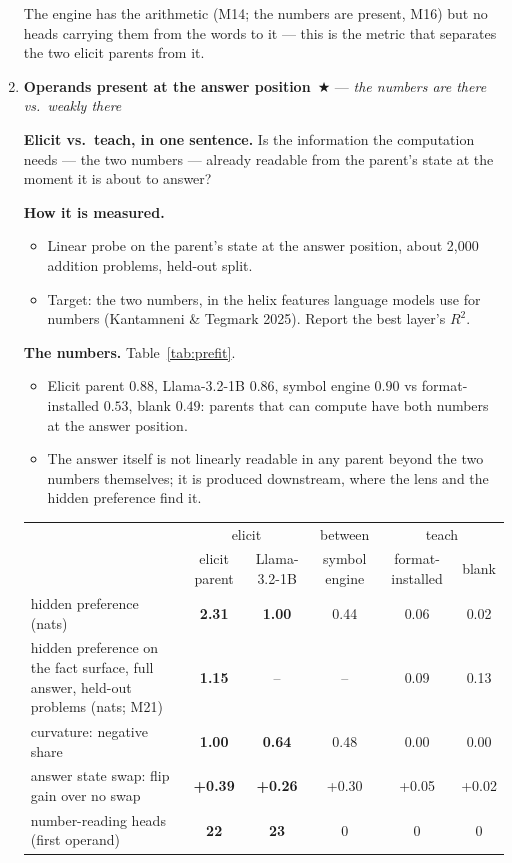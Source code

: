 \documentclass[11pt]{article}
\newcommand{\what}[1]{\par\noindent\textbf{Elicit vs.\ teach, in one sentence.} #1}
\newcommand{\how}[1]{\par\noindent\textbf{How it is measured.} #1}
\newcommand{\numbers}[1]{\par\noindent\textbf{The numbers.} #1\par\medskip}
\newenvironment{steps}{\begin{itemize}[nosep,leftmargin=1.2em,topsep=2pt]}{\end{itemize}}
\newcommand{\metricsecp}[2]{\item \textbf{#1}~$\bigstar$ --- \emph{#2}}
\begin{document}
\begin{enumerate}[label=\textbf{M\arabic*}, leftmargin=*, itemsep=1.2em, resume]
{\begin{steps}
The engine has the arithmetic (M14; the numbers are present, M16) but no heads carrying them
from the words to it --- this is the metric that separates the two elicit parents from it.
\end{steps}}
\metricsecp{Operands present at the answer position}{the numbers are there vs.\ weakly there}
\what{Is the information the computation needs --- the two numbers --- already readable from the
parent's state at the moment it is about to answer?}
\how{
\begin{steps}
\item Linear probe on the parent's state at the answer position, about 2,000 addition problems,
held-out split.
\item Target: the two numbers, in the helix features language models use for numbers
(Kantamneni \& Tegmark 2025). Report the best layer's $R^2$.
\end{steps}}
\numbers{Table~\ref{tab:prefit}.
\begin{steps}
\item Elicit parent $0.88$, Llama-3.2-1B $0.86$, symbol engine $0.90$ vs format-installed $0.53$, blank
$0.49$: parents that can compute have both numbers at the answer position.
\item The answer itself is not linearly readable in any parent beyond the two numbers
themselves; it is produced downstream, where the lens and the hidden preference find it.
\end{steps}}
\begin{table}[h]\centering\small
\begin{adjustbox}{max width=\textwidth}
\begin{tabular}{lccccc}
\toprule
 & \multicolumn{2}{c}{elicit} & between & \multicolumn{2}{c}{teach} \\
 & elicit parent & Llama-3.2-1B & symbol engine & format-installed & blank \\
\midrule
hidden preference (nats) & \textbf{2.31} & \textbf{1.00} & 0.44 & 0.06 & 0.02 \\
hidden preference on the fact surface, full answer, held-out problems (nats; M21) & \textbf{1.15} & -- & -- & 0.09 & 0.13 \\
curvature: negative share & \textbf{1.00} & \textbf{0.64} & 0.48 & 0.00 & 0.00 \\
answer state swap: flip gain over no swap & \textbf{+0.39} & \textbf{+0.26} & +0.30 & +0.05 & +0.02 \\
number-reading heads (first operand) & \textbf{22} & \textbf{23} & 0 & 0 & 0 \\

\end{tabular}
\end{adjustbox}
\end{table}
\end{enumerate}
\end{document}
